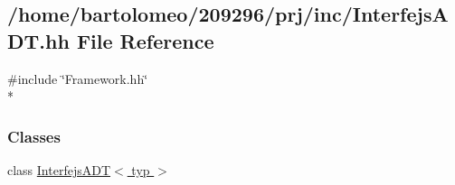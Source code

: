 \hypertarget{_interfejs_a_d_t_8hh}{\subsection{/home/bartolomeo/209296/prj/inc/\-Interfejs\-A\-D\-T.hh File Reference}
\label{_interfejs_a_d_t_8hh}
}
{\ttfamily \#include \char`\"{}Framework.\-hh\char`\"{}}\\*
\subsubsection*{Classes}
\begin{DoxyCompactItemize}
\item 
class \hyperlink{class_interfejs_a_d_t}{Interfejs\-A\-D\-T$<$ typ $>$}
\end{DoxyCompactItemize}
